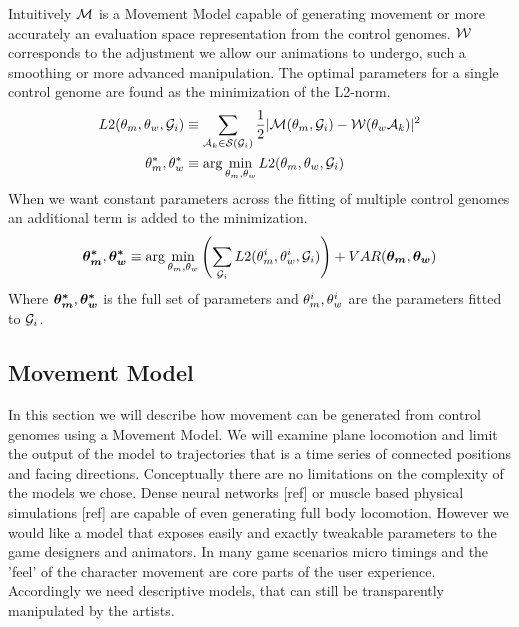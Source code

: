 Intuitively $\mathcal{M}$ is a Movement Model capable of generating movement or more accurately an evaluation space representation from the control genomes. $\mathcal{W}$ corresponds to the adjustment we allow our animations to undergo, such a smoothing or more advanced manipulation. The optimal parameters for a single control genome are found as the minimization of the L2-norm.
\begin{subequations}
\begin{align}
    {L2}(\theta_{m},\theta_{w},\mathcal{G}_i)
    &\equiv
    \sum_{\mathcal{A}_k\in\mathcal{S}(\mathcal{G}_i)}
    {
        \frac{1}{2}
        |\mathcal{M}(\theta_{m},\mathcal{G}_i)
        -
        \mathcal{W}(\theta_{w}\mathcal{A}_k)|^2
    }
    \label{eq:optim:single}
    \\
    \theta_{m}^*,\theta_{w}^*
    &\equiv \arg\min_{\theta_{m},\theta_{w}}
    {
        {L2}(\theta_{m},\theta_{w},\mathcal{G}_i)
    }
\end{align}
\end{subequations}
When we want constant parameters across the fitting of multiple control genomes an additional term is added to the minimization. 
\begin{equation}
    \boldsymbol{\theta_{m}^* },\boldsymbol{\theta_{w}^* }
    \equiv 
    \arg\min_{\theta_{m},\theta_{w}}
    \left(
        \sum_{\mathcal{G}_i}
        {L2}(\theta_{m}^i,\theta_{w}^i,\mathcal{G}_i)
    \right)
    +
    VAR(\boldsymbol{\theta_{m} },\boldsymbol{\theta_{w} })
\end{equation}
Where $\boldsymbol{\theta_{m}^* },\boldsymbol{\theta_{w}^* }$ is the full set of parameters and $\theta_{m}^i,\theta_{w}^i$ are the parameters fitted to $\mathcal{G}_i$.

\subsection{Movement Model}
In this section we will describe how movement can be generated from control genomes using a Movement Model. We will examine plane locomotion and limit the output of the model to trajectories that is a time series of connected positions and facing directions. 
Conceptually there are no limitations on the complexity of the models we chose. Dense neural networks [ref] or muscle based physical simulations [ref] are capable of even generating full body locomotion. However we would like a model that exposes easily and exactly tweakable parameters to the game designers and animators. In many game scenarios micro timings and the 'feel' of the character movement are core parts of the user experience. Accordingly we need descriptive models, that can still be transparently manipulated by the artists. 

